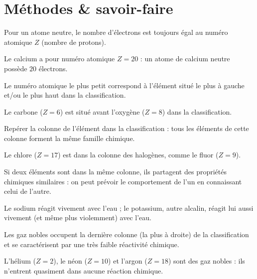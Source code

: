 \section{Méthodes \& savoir-faire}

Pour un atome neutre, le nombre d'électrons est toujours égal au numéro atomique $Z$
(nombre de protons).
\begin{exemple}
Le calcium a pour numéro atomique $Z=20$ : un atome de calcium neutre possède $20$
électrons.
\end{exemple}

Le numéro atomique le plus petit correspond à l'élément situé le plus à gauche et/ou le
plus haut dans la classification.
\begin{exemple}
Le carbone ($Z=6$) est situé avant l'oxygène ($Z=8$) dans la classification.
\end{exemple}

Repérer la colonne de l'élément dans la classification : tous les éléments de cette
colonne forment la même famille chimique.
\begin{exemple}
Le chlore ($Z=17$) est dans la colonne des halogènes, comme le fluor ($Z=9$).
\end{exemple}

Si deux éléments sont dans la même colonne, ils partagent des propriétés chimiques
similaires : on peut prévoir le comportement de l'un en connaissant celui de l'autre.
\begin{exemple}
Le sodium réagit vivement avec l'eau ; le potassium, autre alcalin, réagit lui aussi
vivement (et même plus violemment) avec l'eau.
\end{exemple}

Les gaz nobles occupent la dernière colonne (la plus à droite) de la classification et se
caractérisent par une très faible réactivité chimique.
\begin{exemple}
L'hélium ($Z=2$), le néon ($Z=10$) et l'argon ($Z=18$) sont des gaz nobles : ils
n'entrent quasiment dans aucune réaction chimique.
\end{exemple}

